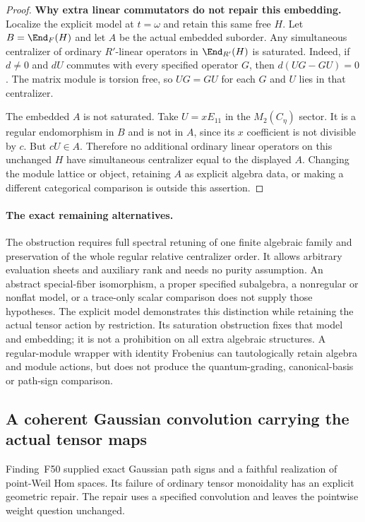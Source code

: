 \documentclass[11pt,a4paper]{article}
\newcommand{\fid}[1]{\textsf{#1}}\newcommand{\gate}[1]{\textsf{#1}}
\theoremstyle{named}\newtheorem{finding}{Finding}[section]
\theoremstyle{definition}\newtheorem{definition}[finding]{Definition}
\theoremstyle{remark}\newtheorem{remark}[finding]{Remark}
\begin{document}
\begin{proof}
\par\smallskip\noindent\textbf{Why extra linear commutators do not repair this embedding.}\quad
Localize the explicit model at $t=\omega$ and retain
this same free $H$. Let $B=\End_F(H)$ and let $A$
be the actual embedded suborder.
Any simultaneous centralizer of ordinary $R'$-linear
operators in $\End_{R'}(H)$ is saturated.
Indeed, if $d\ne0$ and $dU$ commutes with every
specified operator $G$, then
$d(UG-GU)=0$.
The matrix module is torsion free, so $UG=GU$ for
each $G$ and $U$ lies in that centralizer.

The embedded $A$ is not saturated.
Take $U=xE_{11}$ in the $M_2(C_\eta)$ sector.
It is a regular endomorphism in $B$ and is not in
$A$, since its $x$ coefficient is not divisible
by $c$. But $cU\in A$.
Therefore no additional ordinary linear operators
on this unchanged $H$ have simultaneous centralizer
equal to the displayed $A$.
Changing the module lattice or object, retaining
$A$ as explicit algebra data, or making a different
categorical comparison is outside this assertion.
\end{proof}

\paragraph{The exact remaining alternatives.}
The obstruction requires full spectral retuning of
one finite algebraic family and preservation of the
whole regular relative centralizer order.
It allows arbitrary evaluation sheets and auxiliary
rank and needs no purity assumption.
An abstract special-fiber isomorphism, a proper
specified subalgebra, a nonregular or nonflat model,
or a trace-only scalar comparison does not supply
those hypotheses.
The explicit model demonstrates this distinction
while retaining the actual tensor action by restriction.
Its saturation obstruction fixes that model and
embedding; it is not a prohibition on all extra
algebraic structures.
A regular-module wrapper with identity Frobenius
can tautologically retain algebra and module actions,
but does not produce the quantum-grading, canonical-basis
or path-sign comparison.

\subsection{A coherent Gaussian convolution carrying the actual tensor maps}
Finding~\fid{F50} supplied exact Gaussian path signs and a faithful
realization of point-Weil Hom spaces. Its failure of ordinary tensor
monoidality has an explicit geometric repair. The repair uses a
specified convolution and leaves the pointwise weight question unchanged.
\end{document}
